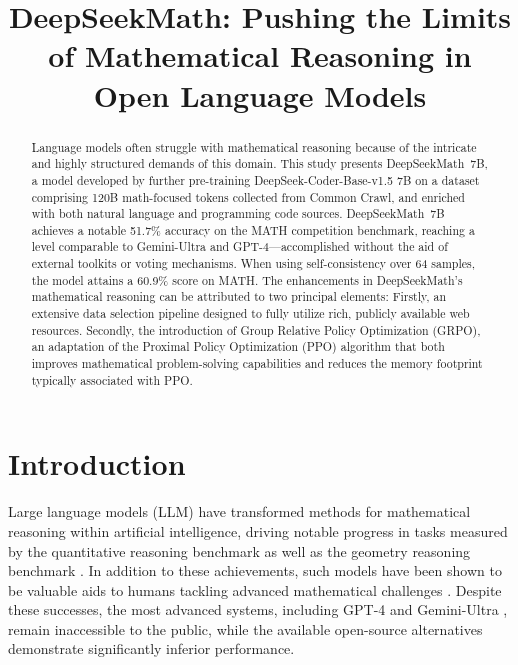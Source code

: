 \title{DeepSeekMath: Pushing the Limits of Mathematical Reasoning in Open Language Models}

\begin{abstract}
Language models often struggle with mathematical reasoning because of the intricate and highly structured demands of this domain. This study presents DeepSeekMath~7B, a model developed by further pre-training DeepSeek-Coder-Base-v1.5 7B on a dataset comprising 120B math-focused tokens collected from Common Crawl, and enriched with both natural language and programming code sources. DeepSeekMath~7B achieves a notable 51.7\% accuracy on the MATH competition benchmark, reaching a level comparable to Gemini-Ultra and GPT-4—accomplished without the aid of external toolkits or voting mechanisms. When using self-consistency over 64 samples, the model attains a 60.9\% score on MATH. The enhancements in DeepSeekMath's mathematical reasoning can be attributed to two principal elements: Firstly, an extensive data selection pipeline designed to fully utilize rich, publicly available web resources. Secondly, the introduction of Group Relative Policy Optimization (GRPO), an adaptation of the Proximal Policy Optimization (PPO) algorithm that both improves mathematical problem-solving capabilities and reduces the memory footprint typically associated with PPO.
\end{abstract}

\section{Introduction}

Large language models (LLM) have transformed methods for mathematical reasoning within artificial intelligence, driving notable progress in tasks measured by the quantitative reasoning benchmark \citep{MATH} as well as the geometry reasoning benchmark \citep{trinh2024solving}. In addition to these achievements, such models have been shown to be valuable aids to humans tackling advanced mathematical challenges \citep{tao}. Despite these successes, the most advanced systems, including GPT-4 \citep{gpt4} and Gemini-Ultra \citep{gemini}, remain inaccessible to the public, while the available open-source alternatives demonstrate significantly inferior performance.

